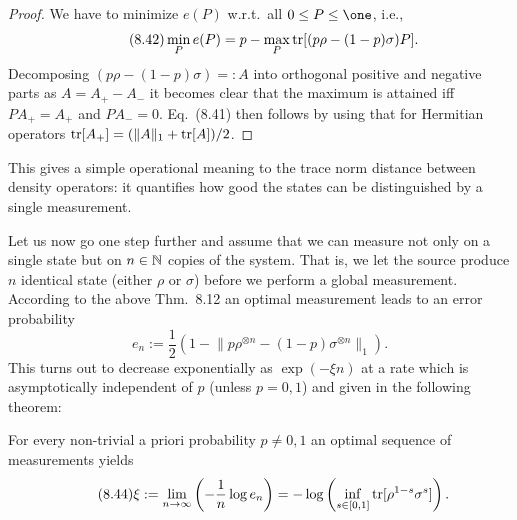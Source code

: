 \documentclass[11pt,a4paper]{article}
\theoremstyle{plain}
\theoremstyle{definition}
\theoremstyle{remark}
\begin{document}
\begin{proof}
    We have to minimize $e(P)$ w.r.t.\ all $0\le P\le\one$, i.e.,
    \begin{equation}\tag{8.42}
        \min_P e(P) = p - \max_P \operatorname{tr}[(p\rho-(1-p)\sigma)P].
    \end{equation}
    Decomposing $(p\rho-(1-p)\sigma)=:A$ into orthogonal positive and negative parts as $A=A_+-A_-$ it becomes clear that the maximum is attained iff
    $PA_+=A_+$ and $PA_-=0$. Eq.~(8.41) then follows by using that for Hermitian operators $\operatorname{tr}[A_+] = (\|A\|_1+\operatorname{tr}[A])/2$.
\end{proof}

This gives a simple operational meaning to the trace norm distance between density operators: it quantifies how good the states can be distinguished by a single measurement.

Let us now go one step further and assume that we can measure not only on a single state but on $n\in\mathbb{N}$ copies of the system. That is, we let the
source produce $n$ identical state (either $\rho$ or $\sigma$) before we perform a global measurement. According to the above Thm.~8.12 an optimal measurement leads
to an error probability
\begin{equation}\tag{8.43}
    e_n := \frac{1}{2}\left(1-\bigl\|p\rho^{\otimes n}-(1-p)\sigma^{\otimes n}\bigr\|_1\right).
\end{equation}
This turns out to decrease exponentially as $\exp(-\xi n)$ at a rate which is asymptotically independent of $p$ (unless $p=0,1$) and given in the following theorem:

\begin{theorem}
    For every non-trivial a priori probability $p\neq 0,1$ an optimal sequence of measurements yields
    \begin{equation}\tag{8.44}
        \xi := \lim_{n\to\infty}\left(-\frac{1}{n}\log e_n\right)
        = -\log\left(\inf_{s\in[0,1]}\operatorname{tr}[\rho^{1-s}\sigma^{s}]\right).
    \end{equation}
\end{theorem}
\end{document}
